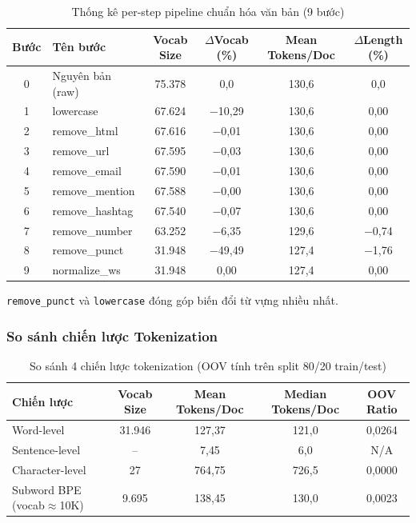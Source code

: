 \documentclass[12pt,a4paper]{article}
\let\oldtextbf\textbf
\renewcommand{\textbf}[1]{\oldtextbf{\textcolor{hcmublue}{#1}}}
\begin{document}
\begin{table}[H]
\centering
\small
\begin{tabular}{|c|l|c|c|c|c|}
\hline
\textbf{Bước} & \textbf{Tên bước} & \textbf{Vocab Size} & \textbf{$\Delta$Vocab (\%)} & \textbf{Mean Tokens/Doc} & \textbf{$\Delta$Length (\%)} \\ \hline
0 & Nguyên bản (raw) & 75.378 & 0{,}0 & 130{,}6 & 0{,}0 \\ \hline
1 & lowercase & 67.624 & $-$10{,}29 & 130{,}6 & 0{,}00 \\ \hline
2 & remove\_html & 67.616 & $-$0{,}01 & 130{,}6 & 0{,}00 \\ \hline
3 & remove\_url & 67.595 & $-$0{,}03 & 130{,}6 & 0{,}00 \\ \hline
4 & remove\_email & 67.590 & $-$0{,}01 & 130{,}6 & 0{,}00 \\ \hline
5 & remove\_mention & 67.588 & $-$0{,}00 & 130{,}6 & 0{,}00 \\ \hline
6 & remove\_hashtag & 67.540 & $-$0{,}07 & 130{,}6 & 0{,}00 \\ \hline
7 & remove\_number & 63.252 & $-$6{,}35 & 129{,}6 & $-$0{,}74 \\ \hline
8 & remove\_punct & 31.948 & $-$49{,}49 & 127{,}4 & $-$1{,}76 \\ \hline
9 & normalize\_ws & 31.948 & 0{,}00 & 127{,}4 & 0{,}00 \\ \hline
\end{tabular}
\caption{Thống kê per-step pipeline chuẩn hóa văn bản (9 bước)}
\label{tab:text_pipeline}
\end{table}

\texttt{remove\_punct} và \texttt{lowercase} đóng góp biến đổi từ vựng nhiều nhất.

\subsubsection{So sánh chiến lược Tokenization}

\begin{table}[H]
\centering
\begin{tabular}{|l|c|c|c|c|}
\hline
\textbf{Chiến lược} & \textbf{Vocab Size} & \textbf{Mean Tokens/Doc} & \textbf{Median Tokens/Doc} & \textbf{OOV Ratio} \\ \hline
Word-level    & 31.946 & 127{,}37 & 121{,}0 & 0{,}0264 \\ \hline
Sentence-level & -- & 7{,}45 & 6{,}0 & N/A \\ \hline
Character-level & 27 & 764{,}75 & 726{,}5 & 0{,}0000 \\ \hline
Subword BPE (vocab${\approx}$10K) & 9.695 & 138{,}45 & 130{,}0 & 0{,}0023 \\ \hline
\end{tabular}
\caption{So sánh 4 chiến lược tokenization (OOV tính trên split 80/20 train/test)}
\label{tab:tokenization}
\end{table}
\end{document}
